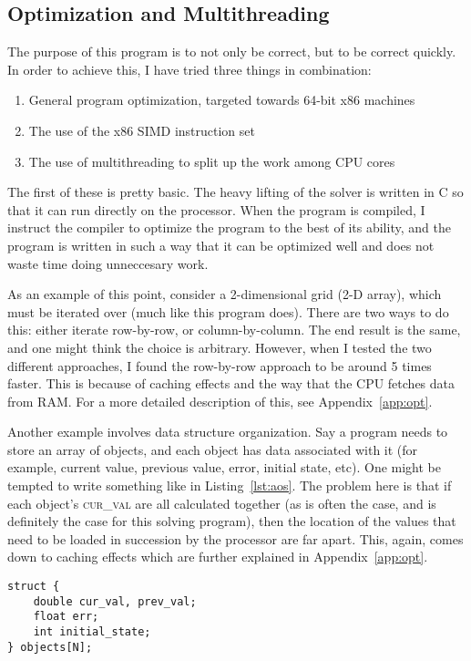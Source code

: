 \subsection{Optimization and Multithreading}
The purpose of this program is to not only be correct, but to be correct quickly. In order to achieve this, I have
tried three things in combination:
\begin{enumerate}
\item General program optimization, targeted towards 64-bit x86 machines
\item The use of the x86 SIMD instruction set
\item The use of multithreading to split up the work among CPU cores
\end{enumerate}
The first of these is pretty basic. The heavy lifting of the solver is written in C so that it can run directly on the
processor. When the program is compiled, I instruct the compiler to optimize the program to the best of its ability,
and the program is written in such a way that it can be optimized well and does not waste time doing unneccesary work.

As an example of this point, consider a 2-dimensional grid (2-D array), which must be iterated over (much like
this program does). There are two ways to do this: either iterate row-by-row, or column-by-column. The end result is
the same, and one might think the choice is arbitrary. However, when I tested the two different approaches, I found
the row-by-row approach to be around 5 times faster. This is because of caching effects and the way that the CPU
fetches data from RAM\cite{intel-1}. For a more detailed description of this, see Appendix~\ref{app:opt}.

Another example involves data structure organization. Say a program needs to store an array of objects, and each object
has data associated with it (for example, current value, previous value, error, initial state, etc). One might be tempted
to write something like in Listing~\ref{lst:aos}. The problem here is that if each object's \textsc{cur\_val} are all
calculated together (as is often the case, and is definitely the case for this solving program), then the location of
the values that need to be loaded in succession by the processor are far apart. This, again, comes down to caching
effects which are further explained in Appendix~\ref{app:opt}.

\begin{minipage}{\linewidth}
\begin{lstlisting}[frame=single,label=lst:aos,caption={Array of structures organization.}]
struct {
	double cur_val, prev_val;
	float err;
	int initial_state;
} objects[N];
\end{lstlisting}
\end{minipage}

